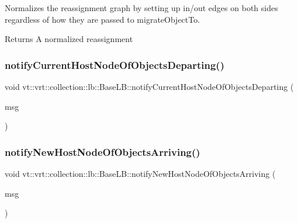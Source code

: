Normalizes the reassignment graph by setting up in/out edges on both sides regardless of how they are passed to {\ttfamily migrate\+Object\+To}. 

\begin{DoxyReturn}{Returns}
A normalized reassignment 
\end{DoxyReturn}
\mbox{\label{structvt_1_1vrt_1_1collection_1_1lb_1_1_base_l_b_a0f3cd0272069ff5fb31d6539c567efeb}} 
\subsubsection{\texorpdfstring{notify\+Current\+Host\+Node\+Of\+Objects\+Departing()}{notifyCurrentHostNodeOfObjectsDeparting()}}
{\footnotesize\ttfamily void vt\+::vrt\+::collection\+::lb\+::\+Base\+L\+B\+::notify\+Current\+Host\+Node\+Of\+Objects\+Departing (\begin{DoxyParamCaption}\item[{\hyperlink{structvt_1_1vrt_1_1collection_1_1lb_1_1_transfer_msg}{Transfer\+Msg}$<$ \hyperlink{structvt_1_1vrt_1_1collection_1_1lb_1_1_base_l_b_ad50ba1022c6beeb6e9187a8f1a3e16fe}{Obj\+Destination\+List\+Type} $>$ $\ast$}]{msg }\end{DoxyParamCaption})}

\mbox{\label{structvt_1_1vrt_1_1collection_1_1lb_1_1_base_l_b_a2bab9ccb4d2378b3915b03c79d5b18c2}} 
\subsubsection{\texorpdfstring{notify\+New\+Host\+Node\+Of\+Objects\+Arriving()}{notifyNewHostNodeOfObjectsArriving()}}
{\footnotesize\ttfamily void vt\+::vrt\+::collection\+::lb\+::\+Base\+L\+B\+::notify\+New\+Host\+Node\+Of\+Objects\+Arriving (\begin{DoxyParamCaption}\item[{\hyperlink{structvt_1_1vrt_1_1collection_1_1lb_1_1_transfer_msg}{Transfer\+Msg}$<$ \hyperlink{structvt_1_1vrt_1_1collection_1_1lb_1_1_base_l_b_ae16d5f0fe9078684bc8e4a4b86ce3a0c}{Obj\+Load\+List\+Type} $>$ $\ast$}]{msg }\end{DoxyParamCaption})}

